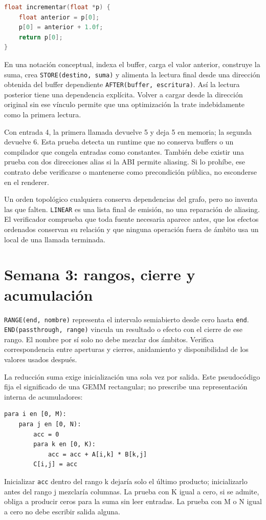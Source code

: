 \documentclass[12pt,a4paper,oneside]{report}
\begin{document}
\begin{lstlisting}[language=C]
float incrementar(float *p) {
    float anterior = p[0];
    p[0] = anterior + 1.0f;
    return p[0];
}
\end{lstlisting}
En una notación conceptual, indexa el buffer, carga el valor anterior, construye la suma, crea \texttt{STORE(destino, suma)} y alimenta la lectura final desde una dirección obtenida del buffer dependiente \texttt{AFTER(buffer\allowbreak{}, escritura)}. Así la lectura posterior tiene una dependencia explícita. Volver a cargar desde la dirección original sin ese vínculo permite que una optimización la trate indebidamente como la primera lectura.

Con entrada 4, la primera llamada devuelve 5 y deja 5 en memoria; la segunda devuelve 6. Esta prueba detecta un runtime que no conserva buffers o un compilador que congela entradas como constantes. También debe existir una prueba con dos direcciones alias si la ABI permite aliasing. Si lo prohíbe, ese contrato debe verificarse o mantenerse como precondición pública, no esconderse en el renderer.

Un orden topológico cualquiera conserva dependencias del grafo, pero no inventa las que falten. \texttt{LINEAR} es una lista final de emisión, no una reparación de aliasing. El verificador comprueba que toda fuente necesaria aparece antes, que los efectos ordenados conservan su relación y que ninguna operación fuera de ámbito usa un local de una llamada terminada.

\section{Semana 3: rangos, cierre y acumulación}
\texttt{RANGE(end, nombre)} representa el intervalo semiabierto desde cero hasta \texttt{end}. \texttt{END(passthro\allowbreak{}ugh, range)} vincula un resultado o efecto con el cierre de ese rango. El nombre por sí solo no debe mezclar dos ámbitos. Verifica correspondencia entre aperturas y cierres, anidamiento y disponibilidad de los valores usados después.

La reducción suma exige inicialización una sola vez por salida. Este pseudocódigo fija el significado de una GEMM rectangular; no prescribe una representación interna de acumuladores:

\begin{lstlisting}
para i en [0, M):
    para j en [0, N):
        acc = 0
        para k en [0, K):
            acc = acc + A[i,k] * B[k,j]
        C[i,j] = acc
\end{lstlisting}
Inicializar \texttt{acc} dentro del rango k dejaría solo el último producto; inicializarlo antes del rango j mezclaría columnas. La prueba con K igual a cero, si se admite, obliga a producir ceros para la suma sin leer entradas. La prueba con M o N igual a cero no debe escribir salida alguna.
\end{document}
